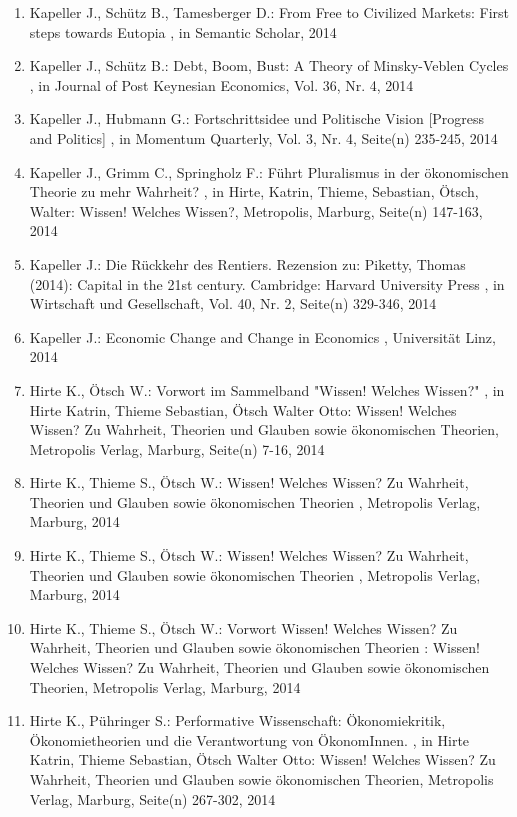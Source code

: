 \begin{enumerate}[leftmargin=*, labelsep=0.5cm]
	 \item Kapeller J., Schütz B., Tamesberger D.:  From Free to Civilized Markets: First steps towards Eutopia  , in Semantic Scholar, 2014
	 \item Kapeller J., Schütz B.:  Debt, Boom, Bust: A Theory of Minsky-Veblen Cycles  , in Journal of Post Keynesian Economics, Vol. 36, Nr. 4, 2014
	 \item Kapeller J., Hubmann G.:  Fortschrittsidee und Politische Vision [Progress and Politics]  , in Momentum Quarterly, Vol. 3, Nr. 4, Seite(n) 235-245, 2014
	 \item Kapeller J., Grimm C., Springholz F.:  Führt Pluralismus in der ökonomischen Theorie zu mehr Wahrheit?  , in Hirte, Katrin, Thieme, Sebastian, Ötsch, Walter: Wissen! Welches Wissen?, Metropolis, Marburg, Seite(n) 147-163, 2014
	 \item Kapeller J.:  Die Rückkehr des Rentiers. Rezension zu: Piketty, Thomas (2014): Capital in the 21st century. Cambridge: Harvard University Press  , in Wirtschaft und Gesellschaft, Vol. 40, Nr. 2, Seite(n) 329-346, 2014
	 \item Kapeller J.:  Economic Change and Change in Economics  , Universität Linz, 2014
	 \item Hirte K., Ötsch W.:  Vorwort im Sammelband "Wissen! Welches Wissen?"  , in Hirte Katrin, Thieme Sebastian, Ötsch Walter Otto: Wissen! Welches Wissen? Zu Wahrheit, Theorien und Glauben sowie ökonomischen Theorien, Metropolis Verlag, Marburg, Seite(n) 7-16, 2014
	 \item Hirte K., Thieme S., Ötsch W.:  Wissen! Welches Wissen? Zu Wahrheit, Theorien und Glauben sowie ökonomischen Theorien  , Metropolis Verlag, Marburg, 2014
	 \item Hirte K., Thieme S., Ötsch W.:  Wissen! Welches Wissen? Zu Wahrheit, Theorien und Glauben sowie ökonomischen Theorien  , Metropolis Verlag, Marburg, 2014
	 \item Hirte K., Thieme S., Ötsch W.:  Vorwort Wissen! Welches Wissen? Zu Wahrheit, Theorien und Glauben sowie ökonomischen Theorien  : Wissen! Welches Wissen? Zu Wahrheit, Theorien und Glauben sowie ökonomischen Theorien, Metropolis Verlag, Marburg, 2014
	 \item Hirte K., Pühringer S.:  Performative Wissenschaft: Ökonomiekritik, Ökonomietheorien und die Verantwortung von ÖkonomInnen.  , in Hirte Katrin, Thieme Sebastian, Ötsch Walter Otto: Wissen! Welches Wissen? Zu Wahrheit, Theorien und Glauben sowie ökonomischen Theorien, Metropolis Verlag, Marburg, Seite(n) 267-302, 2014

\end{enumerate}
